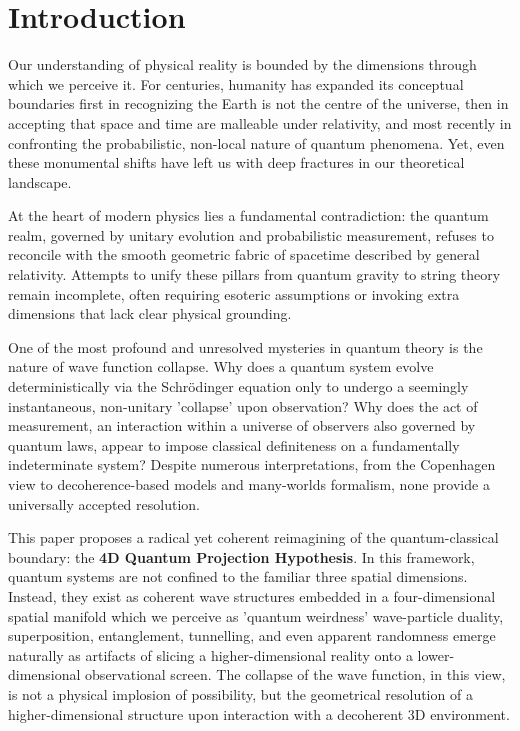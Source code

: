 \documentclass[12pt]{article}
\begin{document}
\tableofcontents
\newpage

\section{Introduction}

Our understanding of physical reality is bounded by the dimensions through which we perceive it. For centuries, humanity has expanded its conceptual boundaries first in recognizing the Earth is not the centre of the universe, then in accepting that space and time are malleable under relativity, and most recently in confronting the probabilistic, non-local nature of quantum phenomena. Yet, even these monumental shifts have left us with deep fractures in our theoretical landscape.

At the heart of modern physics lies a fundamental contradiction: the quantum realm, governed by unitary evolution and probabilistic measurement, refuses to reconcile with the smooth geometric fabric of spacetime described by general relativity. Attempts to unify these pillars from quantum gravity to string theory remain incomplete, often requiring esoteric assumptions or invoking extra dimensions that lack clear physical grounding.

One of the most profound and unresolved mysteries in quantum theory is the nature of wave function collapse. Why does a quantum system evolve deterministically via the Schrödinger equation only to undergo a seemingly instantaneous, non-unitary 'collapse' upon observation? Why does the act of measurement, an interaction within a universe of observers also governed by quantum laws, appear to impose classical definiteness on a fundamentally indeterminate system? Despite numerous interpretations, from the Copenhagen view to decoherence-based models and many-worlds formalism, none provide a universally accepted resolution.

This paper proposes a radical yet coherent reimagining of the quantum-classical boundary: the \textbf{4D Quantum Projection Hypothesis}. In this framework, quantum systems are not confined to the familiar three spatial dimensions. Instead, they exist as coherent wave structures embedded in a four-dimensional spatial manifold which we perceive as 'quantum weirdness' wave-particle duality, superposition, entanglement, tunnelling, and even apparent randomness emerge naturally as artifacts of slicing a higher-dimensional reality onto a lower-dimensional observational screen. The collapse of the wave function, in this view, is not a physical implosion of possibility, but the geometrical resolution of a higher-dimensional structure upon interaction with a decoherent 3D environment.
\end{document}
